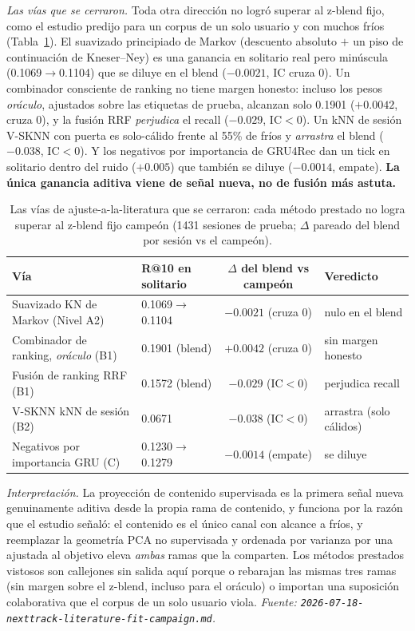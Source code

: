\documentclass[11pt]{article}
\begin{document}
\emph{Las vías que se cerraron.} Toda otra dirección no logró superar al z-blend fijo,
como el estudio predijo para un corpus de un solo usuario y con muchos fríos
(Tabla~\ref{tab:nexttrack-projection-lanes}). El suavizado principiado de Markov
(descuento absoluto $+$ un piso de continuación de Kneser--Ney) es una ganancia en
solitario real pero minúscula (\num{0.1069}$\to$\num{0.1104}) que se diluye en el
blend ($-\num{0.0021}$, IC cruza 0). Un combinador consciente de ranking no tiene
margen honesto: incluso los pesos \emph{oráculo}, ajustados sobre las etiquetas de
prueba, alcanzan solo \num{0.1901} ($+\num{0.0042}$, cruza 0), y la fusión RRF
\emph{perjudica} el recall ($-\num{0.029}$, IC$<$0). Un kNN de sesión V-SKNN con puerta
es solo-cálido frente al 55\% de fríos y \emph{arrastra} el blend ($-\num{0.038}$,
IC$<$0). Y los negativos por importancia de GRU4Rec dan un tick en solitario dentro del
ruido ($+\num{0.005}$) que también se diluye ($-\num{0.0014}$, empate). \textbf{La única
ganancia aditiva viene de señal nueva, no de fusión más astuta.}

\begin{table}[ht]
  \centering
  \caption{Las vías de ajuste-a-la-literatura que se cerraron: cada método prestado no
  logra superar al z-blend fijo campeón (\num{1431} sesiones de prueba; $\Delta$ pareado
  del blend por sesión vs el campeón).}
  \label{tab:nexttrack-projection-lanes}
  {\footnotesize\setlength{\tabcolsep}{5pt}\begin{tabular}{llcl}
    \toprule
    Vía & R@10 en solitario & $\Delta$ del blend vs campeón & Veredicto \\
    \midrule
    Suavizado KN de Markov (Nivel A2)      & 0.1069$\to$0.1104 & $-0.0021$ (cruza 0) & nulo en el blend \\
    Combinador de ranking, \emph{oráculo} (B1) & 0.1901 (blend) & $+0.0042$ (cruza 0) & sin margen honesto \\
    Fusión de ranking RRF (B1)             & 0.1572 (blend) & $-0.029$ (IC$<$0) & perjudica recall \\
    V-SKNN kNN de sesión (B2)              & 0.0671 & $-0.038$ (IC$<$0) & arrastra (solo cálidos) \\
    Negativos por importancia GRU (C)      & 0.1230$\to$0.1279 & $-0.0014$ (empate) & se diluye \\
    \bottomrule
  \end{tabular}}
\end{table}

\emph{Interpretación.} La proyección de contenido supervisada es la primera señal nueva
genuinamente aditiva desde la propia rama de contenido, y funciona por la razón que el
estudio señaló: el contenido es el único canal con alcance a fríos, y reemplazar la
geometría PCA no supervisada y ordenada por varianza por una ajustada al objetivo eleva
\emph{ambas} ramas que la comparten. Los métodos prestados vistosos son callejones sin
salida aquí porque o rebarajan las mismas tres ramas (sin margen sobre el z-blend,
incluso para el oráculo) o importan una suposición colaborativa que el corpus de un solo
usuario viola.
\emph{Fuente: \texttt{2026-07-18-nexttrack-literature-fit-campaign.md}.}
\end{document}
